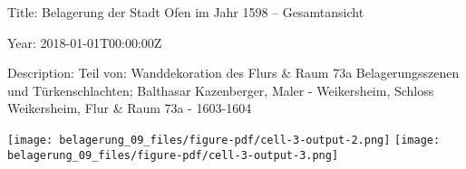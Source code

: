 \documentclass[
  a4paper,
  portrait]{book}
\begin{document}
Title: Belagerung der Stadt Ofen im Jahr 1598 -- Gesamtansicht

Year: 2018-01-01T00:00:00Z

Description: Teil von: Wanddekoration des Flurs \& Raum 73a
Belagerungsszenen und Türkenschlachten; Balthasar Kazenberger, Maler -
Weikersheim, Schloss Weikersheim, Flur \& Raum 73a - 1603-1604

\texttt{[image: belagerung\_09\_files/figure-pdf/cell-3-output-2.png]}
\texttt{[image: belagerung\_09\_files/figure-pdf/cell-3-output-3.png]}

\chapter{}\label{section}

\chapter{}\label{section-1}

\chapter{}\label{section-2}


\backmatter
\end{document}
